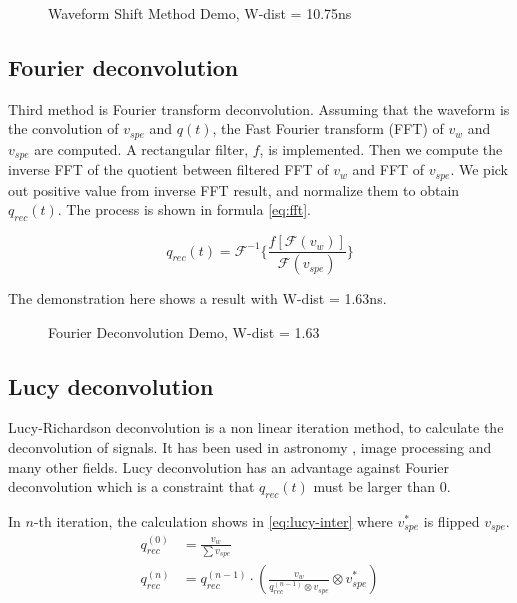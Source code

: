 \begin{figure}[H]
    \centering
    \scalebox{0.4}{}
    \caption{Waveform Shift Method Demo, W-dist = 10.75ns}
\end{figure}

\subsection{Fourier deconvolution}

Third method is Fourier transform deconvolution. Assuming that the waveform is the convolution of $v_{spe}$ and $q(t)$, the Fast Fourier transform (FFT) of $v_{w}$ and $v_{spe}$ are computed. A rectangular filter, $f$, is implemented. Then we compute the inverse FFT of the quotient between filtered FFT of $v_{w}$ and FFT of $v_{spe}$. We pick out positive value from inverse FFT result, and normalize them to obtain $q_{rec}(t)$. The process is shown in formula \eqref{eq:fft}. 

\begin{equation}
    q_{rec}(t) = \mathcal{F}^{-1}\{\frac{f[\mathcal{F}(v_{w})]}{\mathcal{F}(v_{spe})}\}
    \label{eq:fft}
\end{equation}

The demonstration here shows a result with W-dist = 1.63ns. 

\begin{figure}[H]
    \centering
    \scalebox{0.4}{}
    \caption{Fourier Deconvolution Demo, W-dist = 1.63}
\end{figure}

\subsection{Lucy deconvolution}

Lucy-Richardson deconvolution is a non linear iteration method, to calculate the deconvolution of signals. It has been used in astronomy \cite{li_richardson-lucy_2019}, image processing and many other fields. Lucy deconvolution has an advantage against Fourier deconvolution which is a constraint that $q_{rec}(t)$ must be larger than 0. 

In $n$-th iteration, the calculation shows in \eqref{eq:lucy-inter} where $v^{*}_{spe}$ is flipped $v_{spe}$. 
\begin{align}
    q_{rec}^{(0)} &= \frac{v_{w}}{\sum v_{spe}} \\
    q_{rec}^{(n)} &= q_{rec}^{(n-1)} \cdot \left(\frac{v_{w}}{q_{rec}^{(n-1)} \otimes v_{spe}} \otimes v^{*}_{spe}\right) \label{eq:lucy-inter}
\end{align}

